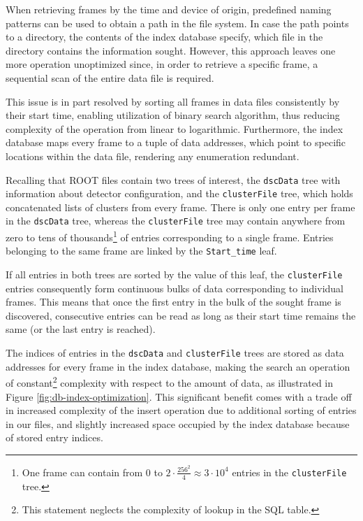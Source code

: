 When retrieving frames by the time and device of origin, predefined naming patterns can be used to obtain a path in the file system. In case the path points to a directory, the contents of the index database specify, which file in the directory contains the information sought. However, this approach leaves one more operation unoptimized since, in order to retrieve a specific frame, a sequential scan of the entire data file is required.

This issue is in part resolved by sorting all frames in data files consistently by their start time, enabling utilization of binary search algorithm, thus reducing complexity of the operation from linear to logarithmic. Furthermore, the index database maps every frame to a tuple of data addresses, which point to specific locations within the data file, rendering any enumeration redundant.

Recalling that ROOT files contain two trees of interest, the \texttt{dscData} tree with information about detector configuration, and the \texttt{clusterFile} tree, which holds concatenated lists of clusters from every frame. There is only one entry per frame in the \texttt{dscData} tree, whereas the \texttt{clusterFile} tree may contain anywhere from zero to tens of thousands\footnote{One frame can contain from 0 to $2\cdot \frac{256^2}{4}\approx 3\cdot 10^4$ entries in the \texttt{clusterFile} tree.} of entries corresponding to a single frame. Entries belonging to the same frame are linked by the \texttt{Start\_time} leaf.

If all entries in both trees are sorted by the value of this leaf, the \texttt{clusterFile} entries consequently form continuous bulks of data corresponding to individual frames. This means that once the first entry in the bulk of the sought frame is discovered, consecutive entries can be read as long as their start time remains the same (or the last entry is reached).

The indices of entries in the \texttt{dscData} and \texttt{clusterFile} trees are stored as data addresses for every frame in the index database, making the search an operation of constant\footnote{This statement neglects the complexity of lookup in the SQL table.} complexity with respect to the amount of data, as illustrated in Figure \ref{fig:db-index-optimization}. This significant benefit comes with a trade off in increased complexity of the insert operation due to additional sorting of entries in our files, and slightly increased space occupied by the index database because of stored entry indices.

